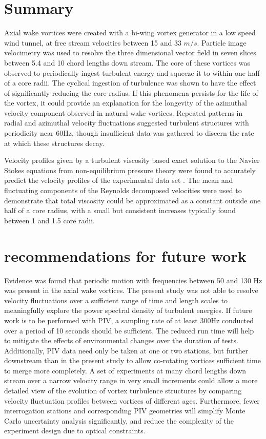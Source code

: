 
\section{Summary}

Axial wake vortices were created with a bi-wing vortex generator in a low speed 
wind tunnel, at free stream velocities between 15 and 33 $m/s$. Particle image 
velocimetry was used to resolve the three dimensional vector field in seven 
slices between 5.4 and 10 chord lengths down stream. The core of these 
vortices was observed to periodically ingest turbulent energy and squeeze it to 
within one half of a core radii. The cyclical ingestion of turbulence was shown 
to have the effect of significantly reducing the core radius. If this phenomena 
persists for the life of the vortex, it could provide an explanation for the 
longevity of the azimuthal velocity component observed in natural wake 
vortices. Repeated patterns in radial and azimuthal velocity fluctuations 
suggested turbulent structures with periodicity near 60Hz, though insufficient 
data was gathered to discern the rate at which these structures decay.

Velocity profiles given by a turbulent viscosity based exact solution to the 
Navier Stokes equations
from non-equilibrium pressure theory were found to accurately predict 
the velocity profiles of the experimental data set \cite{ash2011}. The mean and 
fluctuating components of the Reynolds decomposed velocities were used to 
demonstrate that total viscosity could be approximated as a constant 
outside one half of a core radius, with a small but consistent increases 
typically found between 1 and 1.5 core radii. 

\newpage
\section{recommendations for future work}
Evidence was found that periodic motion with frequencies between 50 and 130 Hz 
was present in the axial wake vortices. The present study was not able to 
resolve velocity fluctuations over a sufficient range of time and length scales 
to meaningfully explore the power spectral density of turbulent energies. If 
future work is to be performed with PIV, a sampling rate of at least 300Hz 
conducted over a period of 10 seconds should be sufficient. The reduced run 
time will help to mitigate the effects of environmental changes over the 
duration of tests. Additionally, PIV 
data need only be taken at one or two stations, but further downstream than in 
the present study to allow co-rotating vortices sufficient time to merge more 
completely. A set of experiments at many chord lengths down stream over a 
narrow 
velocity range in very small increments could allow a 
more detailed view of the evolution of vortex turbulence structures by 
comparing velocity fluctuation profiles between vortices of different ages. 
Furthermore, fewer interrogation stations and corresponding PIV geometries will 
simplify Monte Carlo uncertainty analysis significantly, and reduce the 
complexity of the experiment design due to optical constraints.

